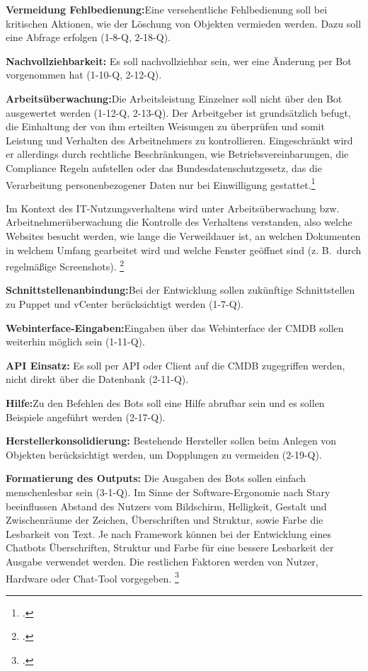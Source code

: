 \textbf{Vermeidung Fehlbedienung:}Eine versehentliche Fehlbedienung soll bei kritischen Aktionen, wie der Löschung von Objekten vermieden werden. Dazu soll eine Abfrage erfolgen (1-8-Q, 2-18-Q).

\textbf{Nachvollziehbarkeit: }Es soll nachvollziehbar sein, wer eine Änderung per Bot vorgenommen hat (1-10-Q, 2-12-Q).

\textbf{Arbeitsüberwachung:}Die Arbeitsleistung Einzelner soll nicht über den Bot ausgewertet werden (1-12-Q, 2-13-Q).
Der Arbeitgeber ist grundsätzlich befugt, die Einhaltung der von ihm erteilten Weisungen zu überprüfen und somit Leistung und Verhalten des Arbeitnehmers zu kontrollieren. Eingeschränkt wird er allerdings durch rechtliche Beschränkungen, wie Betriebsvereinbarungen, die Compliance Regeln aufstellen oder das Bundesdatenschutzgesetz, das die Verarbeitung personenbezogener Daten nur bei Einwilligung gestattet.\footcite[Vgl.][1\psqq]{Rudkowski_2015_Arbeitnehmer}

Im Kontext des IT-Nutzungsverhaltens wird unter Arbeitsüberwachung bzw. Arbeitnehmerüberwachung die Kontrolle des Verhaltens verstanden, also welche Websites besucht werden, wie lange die Verweildauer ist, an welchen Dokumenten in welchem Umfang gearbeitet wird und welche Fenster geöffnet sind (z. B.~durch regelmäßige Screenshots).
\footcite[Vgl.][55]{Rudkowski_2015_Arbeitnehmer}

\textbf{Schnittstellenanbindung:}Bei der Entwicklung sollen zukünftige Schnittstellen zu Puppet und vCenter berücksichtigt werden (1-7-Q).

\textbf{Webinterface-Eingaben:}Eingaben über das Webinterface der \acs{CMDB} sollen weiterhin möglich sein (1-11-Q).

\textbf{API Einsatz:} Es soll per API oder Client auf die \acs{CMDB} zugegriffen werden, nicht direkt über die Datenbank (2-11-Q).

\textbf{Hilfe:}Zu den Befehlen des Bots soll eine Hilfe abrufbar sein und es sollen Beispiele angeführt werden (2-17-Q).

\textbf{Herstellerkonsolidierung:} Bestehende Hersteller sollen beim Anlegen von Objekten berücksichtigt werden, um Dopplungen zu vermeiden (2-19-Q).

\textbf{Formatierung des Outputs:} Die Ausgaben des Bots sollen einfach menschenlesbar sein (3-1-Q). Im Sinne der Software-Ergonomie nach Stary beeinflussen Abstand des Nutzers vom Bildschirm, Helligkeit, Gestalt und Zwischenräume der Zeichen, Überschriften und Struktur, sowie Farbe die Lesbarkeit von Text. Je nach Framework können bei der Entwicklung eines Chatbots Überschriften, Struktur und Farbe für eine bessere Lesbarkeit der Ausgabe verwendet werden. Die restlichen Faktoren werden von Nutzer, Hardware oder Chat-Tool vorgegeben.
\footcite[Vgl.][66\psq]{Stary_1996_Ergonomie}


